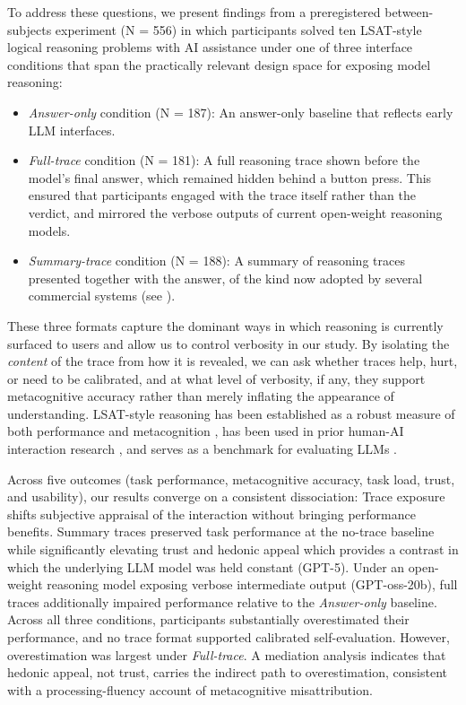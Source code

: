 \documentclass[manuscript,review,anonymous]{acmart}
\begin{document}
To address these questions, we present findings from a preregistered between-subjects experiment (N = 556) in which participants solved ten LSAT-style logical reasoning problems with AI assistance under one of three interface conditions that span the practically relevant design space for exposing model reasoning:


\begin{itemize}
    \item \textit{Answer-only} condition (N = 187): An answer-only baseline that reflects early LLM interfaces.
    \item \textit{Full-trace} condition (N = 181): A full reasoning trace shown before the model's final answer, which remained hidden behind a button press. This ensured that participants engaged with the trace itself rather than the verdict, and mirrored the verbose outputs of current open-weight reasoning models.
    \item \textit{Summary-trace} condition (N = 188): A summary of reasoning traces presented together with the answer, of the kind now adopted by several commercial systems (see \cite{openai2024learning, anthropic2025extended}).
\end{itemize}

These three formats capture the dominant ways in which reasoning is currently surfaced to users and allow us to control verbosity in our study. By isolating the \textit{content} of the trace from how it is revealed, we can ask whether traces help, hurt, or need to be calibrated, and at what level of verbosity, if any, they support metacognitive accuracy rather than merely inflating the appearance of understanding. LSAT-style reasoning has been established as a robust measure of both performance and metacognition \cite{vaccaro2024combinations}, has been used in prior human-AI interaction research \cite{FERNANDES2026108779}, and serves as a benchmark for evaluating LLMs \cite{katz2024gpt}. 


Across five outcomes (task performance, metacognitive accuracy, task load, trust, and usability), our results converge on a consistent dissociation: Trace exposure shifts subjective appraisal of the interaction without bringing performance benefits. Summary traces preserved task performance at the no-trace baseline while significantly elevating trust and hedonic appeal  which provides a contrast in which the underlying LLM model was held constant (GPT-5). Under an open-weight reasoning model exposing verbose intermediate output (GPT-oss-20b), full traces additionally impaired performance relative to the \textit{Answer-only} baseline. Across all three conditions, participants substantially overestimated their performance, and no trace format supported calibrated self-evaluation. However, overestimation was largest under \textit{Full-trace}. A mediation analysis indicates that hedonic appeal, not trust, carries the indirect path to overestimation, consistent with a processing-fluency account of metacognitive misattribution.
\end{document}
